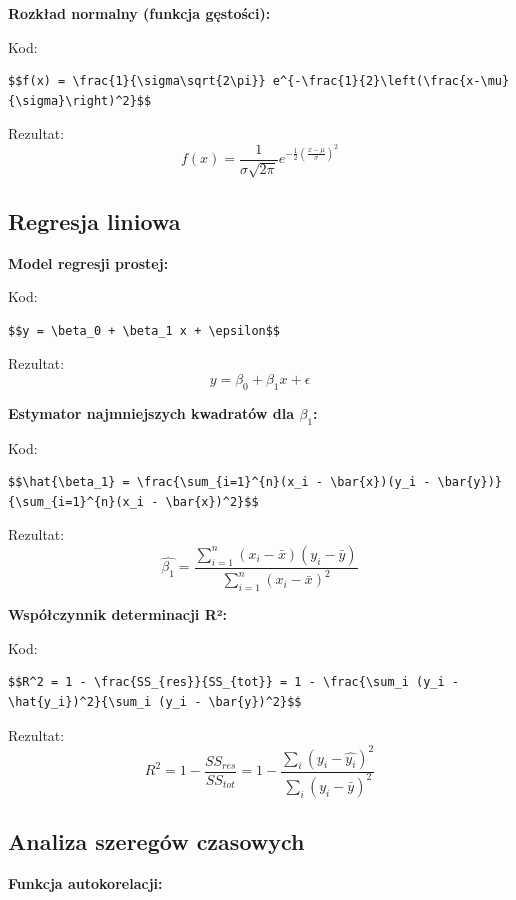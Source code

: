 \documentclass[
  polish,
  letterpaper,
  DIV=11,
  numbers=noendperiod]{scrreprt}
\begin{document}
\textbf{Rozkład normalny (funkcja gęstości):}

Kod:

\begin{verbatim}
$$f(x) = \frac{1}{\sigma\sqrt{2\pi}} e^{-\frac{1}{2}\left(\frac{x-\mu}{\sigma}\right)^2}$$
\end{verbatim}

Rezultat:
\[f(x) = \frac{1}{\sigma\sqrt{2\pi}} e^{-\frac{1}{2}\left(\frac{x-\mu}{\sigma}\right)^2}\]

\subsection{Regresja liniowa}\label{regresja-liniowa}

\textbf{Model regresji prostej:}

Kod:

\begin{verbatim}
$$y = \beta_0 + \beta_1 x + \epsilon$$
\end{verbatim}

Rezultat: \[y = \beta_0 + \beta_1 x + \epsilon\]

\textbf{Estymator najmniejszych kwadratów dla \(\beta_1\):}

Kod:

\begin{verbatim}
$$\hat{\beta_1} = \frac{\sum_{i=1}^{n}(x_i - \bar{x})(y_i - \bar{y})}{\sum_{i=1}^{n}(x_i - \bar{x})^2}$$
\end{verbatim}

Rezultat:
\[\hat{\beta_1} = \frac{\sum_{i=1}^{n}(x_i - \bar{x})(y_i - \bar{y})}{\sum_{i=1}^{n}(x_i - \bar{x})^2}\]

\textbf{Współczynnik determinacji R²:}

Kod:

\begin{verbatim}
$$R^2 = 1 - \frac{SS_{res}}{SS_{tot}} = 1 - \frac{\sum_i (y_i - \hat{y_i})^2}{\sum_i (y_i - \bar{y})^2}$$
\end{verbatim}

Rezultat:
\[R^2 = 1 - \frac{SS_{res}}{SS_{tot}} = 1 - \frac{\sum_i (y_i - \hat{y_i})^2}{\sum_i (y_i - \bar{y})^2}\]

\subsection{Analiza szeregów
czasowych}\label{analiza-szereguxf3w-czasowych}

\textbf{Funkcja autokorelacji:}
\end{document}
